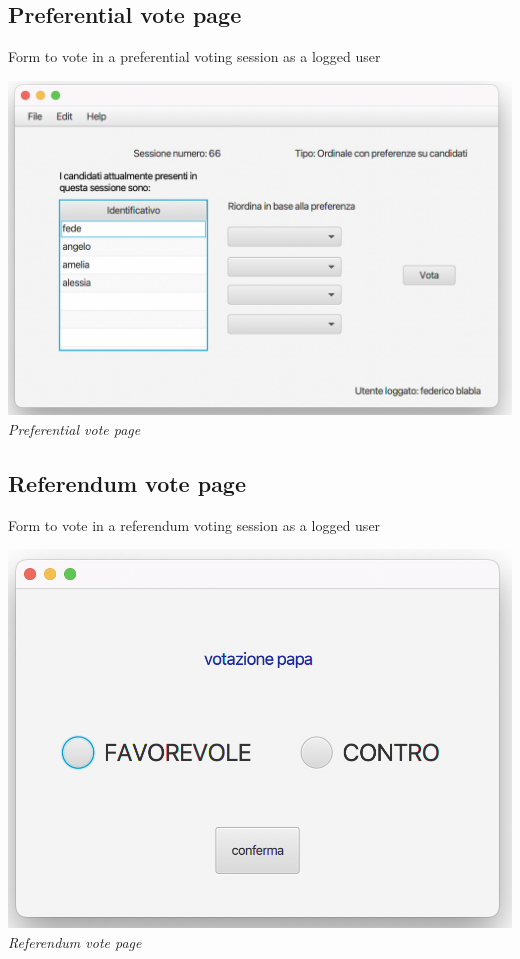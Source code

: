 \documentclass[11pt, oneside]{article}   	%
\begin{document}
\subsection{Preferential vote page}
Form to vote in a preferential voting session as a logged user
    \begin{center}
    \includegraphics[scale=0.45]{images/ui10.png}\\
    \emph{Preferential vote page}
    \end{center}
\subsection{Referendum vote page}
Form to vote in a referendum voting session as a logged user
    \begin{center}
    \includegraphics[scale=0.5]{images/ui11.png}\\
    \emph{Referendum vote page}
    \end{center}
\end{document}
